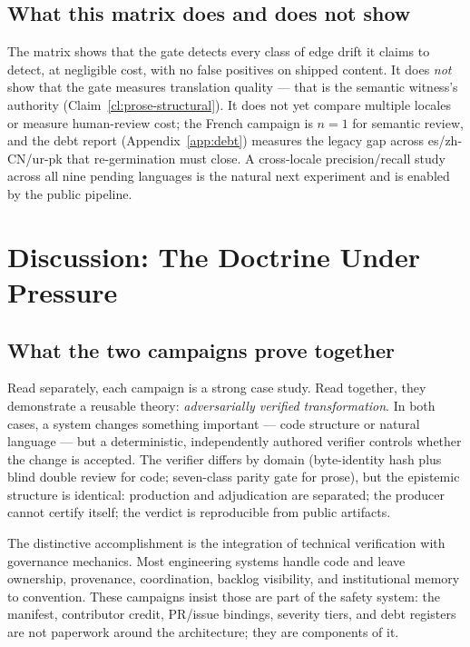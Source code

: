 \documentclass[11pt]{article}
\theoremstyle{definition}
\theoremstyle{plain}
\theoremstyle{remark}
\begin{document}
\subsection{What this matrix does and does not show}

The matrix shows that the gate detects every class of edge drift it claims
to detect, at negligible cost, with no false positives on shipped content.
It does \emph{not} show that the gate measures translation quality --- that
is the semantic witness's authority (Claim~\ref{cl:prose-structural}). It
does not yet compare multiple locales or measure human-review cost; the
French campaign is $n=1$ for semantic review, and the debt report
(Appendix~\ref{app:debt}) measures the legacy gap across es/zh-CN/ur-pk that
re-germination must close. A cross-locale precision/recall study across all
nine pending languages is the natural next experiment and is enabled by the
public pipeline.

\section{Discussion: The Doctrine Under Pressure}
\label{sec:synthesis-discussion}

\subsection{What the two campaigns prove together}

Read separately, each campaign is a strong case study. Read together, they
demonstrate a reusable theory: \emph{adversarially verified transformation}.
In both cases, a system changes something important --- code structure or
natural language --- but a deterministic, independently authored verifier
controls whether the change is accepted. The verifier differs by domain
(byte-identity hash plus blind double review for code; seven-class parity
gate for prose), but the epistemic structure is identical: production and
adjudication are separated; the producer cannot certify itself; the verdict
is reproducible from public artifacts.

The distinctive accomplishment is the integration of technical verification
with governance mechanics. Most engineering systems handle code and leave
ownership, provenance, coordination, backlog visibility, and institutional
memory to convention. These campaigns insist those are part of the safety
system: the manifest, contributor credit, PR/issue bindings, severity tiers,
and debt registers are not paperwork around the architecture; they are
components of it.
\end{document}
